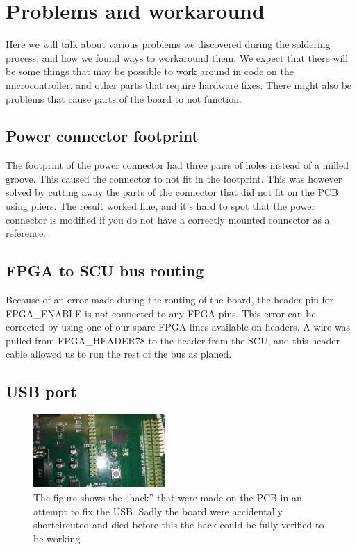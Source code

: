 \section {Problems and workaround}
Here we will talk about various problems we discovered during the soldering process, and how we found ways to workaround them.
We expect that there will be some things that may be possible to work around in code on the microcontroller, and other parts that require hardware fixes.
There might also be problems that cause parts of the board to not function.

\subsection{ Power connector footprint }

The footprint of the power connector had three pairs of holes instead of a milled groove.
This caused the connector to not fit in the footprint.
This was however solved by cutting away the parts of the connector that did not fit on the PCB using pliers.
The result worked fine, and it's hard to spot that the power connector is modified if you do not have a correctly mounted connector as a reference.

\subsection{ FPGA to SCU bus routing }

Because of an error made during the routing of the board, the header pin for FPGA\_ENABLE is not connected to any FPGA pins.
This error can be corrected by using one of our spare FPGA lines available on headers.
A wire was pulled from FPGA\_HEADER78 to the header from the SCU, and this header cable allowed us to run the rest of the bus as planed.

\subsection{ USB port }

\begin{figure}
\centering
\includegraphics[width=5cm,keepaspectratio]{pcb/vreghack.jpg}
\caption{The figure shows the ``hack'' that were made on the PCB in an attempt to fix the USB. Sadly the board were accidentally shortcircuted and died before this the hack could be fully verified to be working}
\label{figure:vreghack}
\end{figure}

